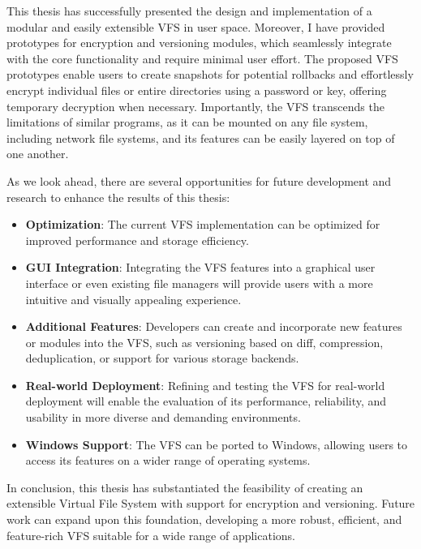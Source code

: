 
This thesis has successfully presented the design and implementation of a modular and easily extensible VFS in user space.
Moreover, I have provided prototypes for encryption and versioning modules, which seamlessly integrate with the core functionality and require minimal user effort.
The proposed VFS prototypes enable users to create snapshots for potential rollbacks and effortlessly encrypt individual files or entire directories using a password or key, offering temporary decryption when necessary.
Importantly, the VFS transcends the limitations of similar programs, as it can be mounted on any file system, including network file systems, and its features can be easily layered on top of one another.

As we look ahead, there are several opportunities for future development and research to enhance the results of this thesis:

\begin{itemize}
    \item \textbf{Optimization}: The current VFS implementation can be optimized for improved performance and storage efficiency.
    \item \textbf{GUI Integration}: Integrating the VFS features into a graphical user interface or even existing file managers will provide users with a more intuitive and visually appealing experience.
    \item \textbf{Additional Features}: Developers can create and incorporate new features or modules into the VFS, such as versioning based on diff, compression, deduplication, or support for various storage backends.
    \item \textbf{Real-world Deployment}: Refining and testing the VFS for real-world deployment will enable the evaluation of its performance, reliability, and usability in more diverse and demanding environments.
    \item \textbf{Windows Support}: The VFS can be ported to Windows, allowing users to access its features on a wider range of operating systems.
\end{itemize}

In conclusion, this thesis has substantiated the feasibility of creating an extensible Virtual File System with support for encryption and versioning.
Future work can expand upon this foundation, developing a more robust, efficient, and feature-rich VFS suitable for a wide range of applications.